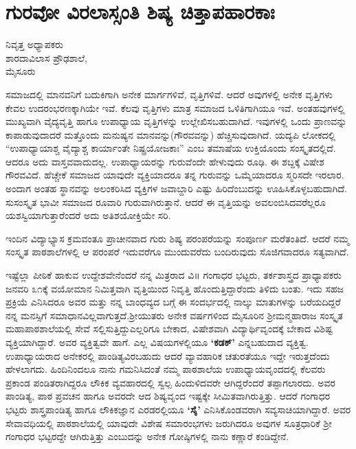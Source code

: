 {\fontsize{14}{16}\selectfont
\chapter{ಗುರವೋ ವಿರಲಾಸ್ಸಂತಿ ಶಿಷ್ಯ ಚಿತ್ತಾಪಹಾರಕಾಃ}

\begin{center}
\smallskip

ನಿವೃತ್ತ ಅಧ್ಯಾಪಕರು\\
ಶಾರದಾವಿಲಾಸ ಪ್ರೌಢಶಾಲೆ,\\ 
ಮೈಸೂರು
\addrule
\end{center}

ಸಮಾಜದಲ್ಲಿ ಮಾನವನಿಗೆ ಬದುಕಿಗಾಗಿ ಅನೇಕ ಮಾರ್ಗಗಳಿವೆ, ವೃತ್ತಿಗಳಿವೆ. ಆದರೆ ಅವುಗಳಲ್ಲಿ ಅನೇಕ ವೃತ್ತಿಗಳು ಕೇವಲ ಉದರಂಭರಣಕ್ಕಾಗಿಯೇ ಇವೆ. ಕೆಲವು ವೃತ್ತಿಗಳು ಮಾತ್ರ ಸಮಾಜದ ಒಳಿತಿಗಾಗಿಯೂ ಇವೆ. ಅಂತಹವುಗಳಲ್ಲಿ ಮುಖ್ಯವಾಗಿ ವೈದ್ಯವೃತ್ತಿ ಹಾಗೂ ಉಪಾಧ್ಯಾಯ ವೃತ್ತಿಗಳನ್ನು ಉಲ್ಲೇಖಿಸಬಹುದಾಗಿದೆ. ಇವುಗಳಲ್ಲಿ ಒಂದು ಪ್ರಾಣವನ್ನು ಕಾಪಾಡುವುದಾದರೆ ಮತ್ತೊಂದು ಮನುಷ್ಯನ ಮಾನವನ್ನು(ಗೌರವವನ್ನು) ಹೆಚ್ಚಿಸುವುದಾಗಿದೆ. ಯದ್ಯಪಿ ಲೋಕದಲ್ಲಿ “ಉಪಾಧ್ಯಾಯಾಶ್ಚ ವೈದ್ಯಾಶ್ಚ ಕಾರ್ಯಾಂತೇ ನಿಷ್ಪ್ರಯೋಜಕಾಃ” ಎಂಬ ತಮಾಷೆಯ ಉಕ್ತಿಯೊಂದು ಸಂಸ್ಕೃತದಲ್ಲಿದೆ. ಆದರೂ ಅದು ವಾಸ್ತವವಾದುದಲ್ಲ. ಉಪಾಧ್ಯಾಯರನ್ನು ಗುರುವೆಂದೇ ಹೇಳುವುದು ರೂಢಿ. ಈ ಶಬ್ದಕ್ಕೆ ವಿಷೇಶ ಗೌರವವಿದೆ. ಹೆಚ್ಚೇಕೆ ಸಮಾಜದ ಯಾವುದೇ ವ್ಯಕ್ತಿಯಾದರೂ ತನ್ನ ಗುರುವನ್ನು ಒಮ್ಮೆಯಾದರೂ ಸ್ಮರಿಸದೇ ಇರಲಾರ. ಅಂದಾಗ ಅಂತಹ ಸ್ಥಾನವನ್ನು ಅಲಂಕರಿಸಿದ ವ್ಯಕ್ತಿಗಳ ಜವಾಬ್ದಾರಿ ಎಷ್ಟು ಹಿರಿದೆಂಬುದನ್ನು ಊಹಿಸಿಕೊಳ್ಳಬಹುದಾಗಿದೆ. ಸುಸಂಸ್ಕೃತ ಭಾವೀ ಸಮಾಜದ ರೂವಾರಿ ಗುರುವಾಗಿರುತ್ತಾನೆ. ಆದರೆ ಈ ವೃತ್ತಿಯನ್ನು ಅವಲಂಬಿಸಿದವರೆಲ್ಲರೂ ಯಶಸ್ವಿಯಾಗುತ್ತಾರೆಂದರೆ ಅದು ಅತಿಶಯೋಕ್ತಿಯೇ ಸರಿ.

ಇಂದಿನ ವಿದ್ಯಾಭ್ಯಾಸ ಕ್ರಮವಂತೂ ಪ್ರಾಚೀನವಾದ ಗುರು ಶಿಷ್ಯ ಪರಂಪರೆಯನ್ನು ಸಂಪೂರ್ಣ ಮರೆತಂತಿದೆ. ಆದರೆ ನಮ್ಮ ಸಂಸ್ಕೃತ ಪಾಠಶಾಲೆಗಳಲ್ಲಿ ಆ ಪರಂಪರೆ ಇದುವರೆಗೂ ಮುಂದುವರೆದು ಬಂದಿರುವುದು ಸೊಜಿಗವಾದರೂ ಸತ್ಯವಾಗಿದೆ.

ಇಷ್ಟೆಲ್ಲಾ ಪೀಠಿಕೆ ಹಾಕುವ ಉದ್ದೇಶವೇನೆಂದರೆ ನನ್ನ ಮಿತ್ರರಾದ ವಿ॥ ಗಂಗಾಧರ ಭಟ್ಟರು, ತರ್ಕಶಾಸ್ತ್ರದ ಪ್ರಾಧ್ಯಾಪಕರು ಜನವರಿ ೩೧ಕ್ಕೆ ವಯೋಮಾನ ನಿಮಿತ್ತ\-ವಾಗಿ ವೃತ್ತಿಯಿಂದ ನಿವೃತ್ತಿ ಹೊಂದುತ್ತಿದ್ದಾರೆಂದು ತಿಳಿದು ಬಂತು. ಇದು ಸಹಜ ಪ್ರಕ್ರಿಯೆ ಎನಿಸಿದರೂ ಅವರ ಮತ್ತು ನನ್ನ ಬಾಂಧವ್ಯದ ಬಗ್ಗೆ ಈ ಸಂದರ್ಭದಲ್ಲಿ ನಾಲ್ಕು ಮಾತುಗಳನ್ನು ಬರೆಯದಿದ್ದರೆ ನನ್ನ ಮನಸ್ಸಿಗೆ ಸಮಾಧಾನವಿಲ್ಲವಾಗುತ್ತದೆ.\break ಶ್ರೀಯುತರು ಅನೇಕ ವರ್ಷಗಳಿಂದ ಮೈಸೂರಿನ ಶ್ರೀಮನ್ಮಹಾರಾಜ ಸಂಸ್ಕೃತ ಮಹಾಪಾಠಶಾಲೆಯಲ್ಲಿ ಸೇವೆ ಸಲ್ಲಿಸುತ್ತಿದ್ದುಎಲ್ಲರಿಗೂ ಬೇಕಾದ, ವಿಷೇಶವಾಗಿ ವಿದ್ಯಾರ್ಥಿವೃಂದಕ್ಕೆ ಬೇಕಾದ ವಿಶಿಷ್ಟ ವ್ಯಕ್ತಿಯಾಗಿದ್ದಾರೆ. ಅವರ ವ್ಯಕ್ತಿತ್ವವೇ ಹಾಗೆ. ಎಲ್ಲ ವಿಷಯಗಳಲ್ಲಿಯೂ \textbf{‘ಕಡಕ್’} ಎನ್ನಬಹುದಾದ ವ್ಯಕ್ತಿತ್ವ. ಉಪಾಧ್ಯಾಯರಾದ ಅನೇಕರಲ್ಲಿ ಪಾಂಡಿತ್ಯ\-ವಿರಬಹುದು ಆದರೆ ವ್ಯಾವಹಾರಿಕ ಚತುರತೆಯೂ ಇದ್ದೇ ಇರುತ್ತದೆಂದು ಹೇಳಲಾಗದು. ಹಿಂದಿನಿಂದಲೂ ನಾನು ಗಮನಿಸಿದಂತೆ ನಮ್ಮ ಪಾಠಶಾಲೆಯ ಉಪಾಧ್ಯಾಯವೃಂದದಲ್ಲಿ ಕೆಲವರು ಪ್ರಕಾಂಡ ಪಂಡಿತರಾಗಿದ್ದರೂ ಲೌಕಿಕ ವ್ಯವಹಾರದಲ್ಲಿ ಸ್ವಲ್ಪ ಹಿಂದುಳಿದವರೇ ಆಗಿದ್ದರೆಂದರೆ ತಪ್ಪಾಗಲಾರದು. ಅವರ ಪಾಂಡಿತ್ಯ, ಪಾಠ ಪ್ರವಚನ ಹಾಗೂ ಅವರದೇ ಆದ ಶಿಷ್ಯವೃಂದ ಇಷ್ಟಕ್ಕೇ ಸೀಮಿತವಾಗಿರುತ್ತಿತ್ತು. ಆದರೆ ಗಂಗಾಧರ ಭಟ್ಟರು ಶಾಸ್ತ್ರಪಾಂಡಿತ್ಯ ಹಾಗೂ ಲೌಕಿಕಜ್ಞಾನ ಎರಡರಲ್ಲಿಯೂ \textbf{‘ಸೈ’} ಎನಿಸಿಕೊಂಡವರಾಗಿ ಸವ್ಯಸಾಚಿಯಾಗಿದ್ದಾರೆ. ಅವರ ಸೇವಾವಧಿಯಲ್ಲಿ ಪಾಠಶಾಲೆಯಲ್ಲಿ ಯಾವುದೇ ವಿಶೇಷ ಸಮಾರಂಭಗಳು ಜರುಗಿದರೂ ಅವುಗಳ ಸೂತ್ರಧಾರಿಕೆ ಶ್ರೀ ಗಂಗಾಧರ ಭಟ್ಟರದ್ದೇ ಆಗಿರುತ್ತಿತ್ತು ಎಂಬುದನ್ನು ಅನೇಕ ಗೋಷ್ಠಿಗಳಲ್ಲಿ ನಾನು ಕಣ್ಣಾರೆ ಕಂಡಿದ್ದೇನೆ.

}
